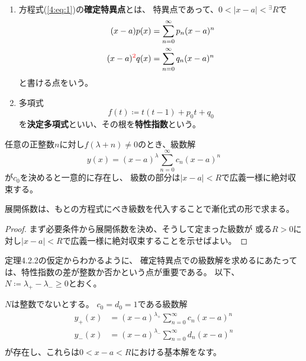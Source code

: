 \documentclass[report]{jlreq}
\begin{document}
\begin{definition}[4.2.1 確定特異点]
    \,
    \begin{enumerate}
        \item 方程式(\ref{4:eq:1})の\textbf{確定特異点}とは、
            特異点であって、$0 < |x - a| < {}^\exists R$で
            \begin{equation}
                \begin{split}
                    (x - a)p(x) &= \sum_{n=0}^\infty p_n (x - a)^n \\
                    (x - a)^{\textcolor{red}{2}} q(x) &= \sum_{n = 0}^\infty q_n (x - a)^n
                \end{split}
            \end{equation}
            と書ける点をいう。
        \item 多項式
            \begin{equation}
                f(t) \coloneqq t(t-1) + p_0 t + q_0
            \end{equation}
            を\textbf{決定多項式}といい、その根を\textbf{特性指数}という。
    \end{enumerate}
\end{definition}

\begin{theorem}[4.2.2 確定特異点での級数解の存在]
    任意の正整数$n$に対し$f(\lambda + n) \neq 0$のとき、級数解
    \begin{equation}
        y(x) = (x - a)^{\lambda} \sum_{n = 0}^\infty c_n (x - a)^n
    \end{equation}
    が$c_0$を決めると一意的に存在し、
    級数の部分は$|x - a| < R$で広義一様に絶対収束する。
\end{theorem}

展開係数は、もとの方程式にべき級数を代入することで漸化式の形で求まる。

\begin{proof}
    まず必要条件から展開係数を決め、そうして定まった級数が
    或る$R > 0$に対し$|x - a| < R$で広義一様に絶対収束することを示せばよい。
\end{proof}

定理4.2.2の仮定からわかるように、
確定特異点での級数解を求めるにあたっては、特性指数の差が整数か否かという点が重要である。
以下、$N \coloneqq \lambda_+ - \lambda_- \ge 0$とおく。

\begin{corollary}[4.2.3 $N$が整数でない場合の基本解]
    $N$は整数でないとする。
    $c_{0} = d_{0} = 1$である級数解
    \begin{equation}
        \begin{split}
            y_{+}(x) &= (x - a)^{\lambda_+} \sum_{n = 0}^\infty c_{n} (x - a)^n \\
            y_{-}(x) &= (x - a)^{\lambda_-} \sum_{n = 0}^\infty d_{n} (x - a)^n \\
        \end{split}
        \label{4:eq:2}
    \end{equation}
    が存在し、これらは$0 < x - a < R$における基本解をなす。
\end{corollary}
\end{document}
